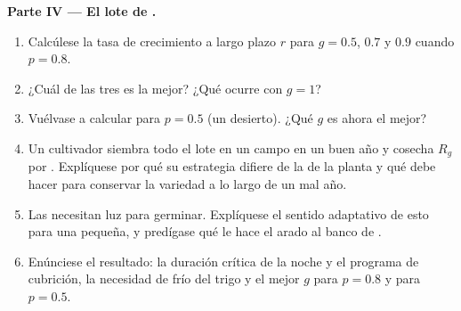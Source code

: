 \begin{problem}
\medskip
\noindent\textbf{Parte IV --- El lote de .}
\begin{enumerate}[resume]
  \item Calcúlese la tasa de crecimiento a largo plazo $r$ para $g = 0.5$,
        $0.7$ y $0.9$ cuando $p = 0.8$.
  \item ¿Cuál de las tres es la mejor? ¿Qué ocurre con $g = 1$?
  \item Vuélvase a calcular para $p = 0.5$ (un desierto). ¿Qué $g$ es ahora
        el mejor?
  \item Un cultivador siembra todo el lote en un campo en un buen año y
        cosecha $R_g$ por . Explíquese por qué su estrategia difiere
        de la de la planta y qué debe hacer para conservar la variedad a
        lo largo de un mal año.
  \item Las  necesitan luz para germinar. Explíquese el sentido
        adaptativo de esto para una  pequeña, y predígase qué le
        hace el arado al banco de .
  \item Enúnciese el resultado: la duración crítica de la noche y el
        programa de cubrición, la necesidad de frío del trigo y el mejor
        $g$ para $p = 0.8$ y para $p = 0.5$.
\end{enumerate}
\end{problem}
